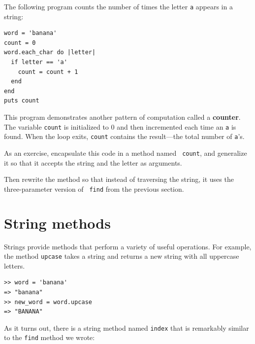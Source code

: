\documentclass[10pt]{book}
\begin{document}
The following program counts the number of times the letter {\tt a}
appears in a string:

\begin{verbatim}
word = 'banana'
count = 0
word.each_char do |letter|
  if letter == 'a'
    count = count + 1
  end
end
puts count
\end{verbatim}
%
This program demonstrates another pattern of computation called a {\bf
counter}.  The variable {\tt count} is initialized to 0 and then
incremented each time an {\tt a} is found.
When the loop exits, {\tt count}
contains the result---the total number of {\tt a}'s.

As an exercise, encapsulate this code in a method named {\tt
count}, and generalize it so that it accepts the string and the
letter as arguments.

Then rewrite the method so that instead of
traversing the string, it uses the three-parameter version of {\tt
find} from the previous section.


\section{String methods}
\label{optional}

Strings provide methods that perform a variety of useful operations.
For example, the
method {\tt upcase} takes a string and returns a new string with
all uppercase letters.


\begin{verbatim}
>> word = 'banana'
=> "banana"
>> new_word = word.upcase
=> "BANANA"
\end{verbatim}
%

As it turns out, there is a string method named {\tt index} that
is remarkably similar to the {\tt find} method we wrote:
\end{document}
